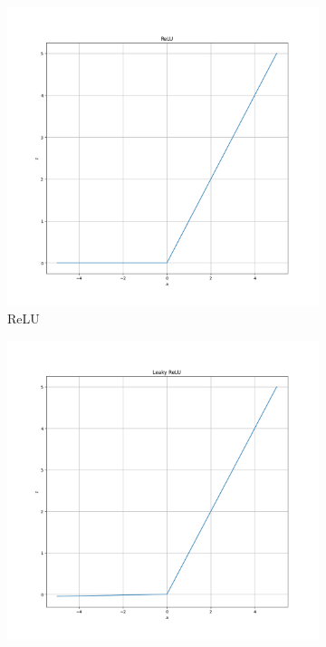 \begin{figure}
	\begin{subfigure}{0.24\linewidth}
		\includegraphics[width=\linewidth]{figures/relu.png}
		\caption{ReLU}
	\end{subfigure}
	\begin{subfigure}{0.24\linewidth}
		\includegraphics[width=\linewidth]{figures/leakyrelu.png}

\end{subfigure}
\end{figure}
